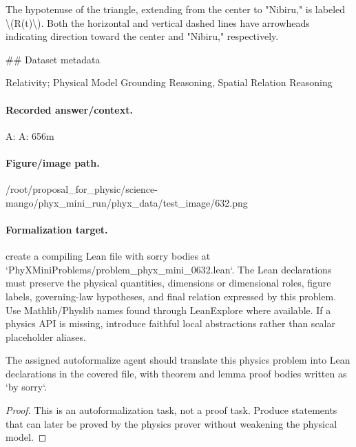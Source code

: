 The hypotenuse of the triangle, extending from the center to "Nibiru," is labeled \textbackslash{}(R(t)\textbackslash{}). Both the horizontal and vertical dashed lines have arrowheads indicating direction toward the center and "Nibiru," respectively.

\#\# Dataset metadata

Relativity; Physical Model Grounding Reasoning, Spatial Relation Reasoning

\paragraph{Recorded answer/context.}
A: A: 656m

\paragraph{Figure/image path.}
/root/proposal\_for\_physic/science-mango/phyx\_mini\_run/phyx\_data/test\_image/632.png

\paragraph{Formalization target.}
create a compiling Lean file with sorry bodies at `PhyXMiniProblems/problem\_phyx\_mini\_0632.lean`. The Lean declarations must preserve the physical quantities, dimensions or dimensional roles, figure labels, governing-law hypotheses, and final relation expressed by this problem.
Use Mathlib/Physlib names found through LeanExplore where available. If a physics API is missing, introduce faithful local abstractions rather than scalar placeholder aliases.

\begin{theorem}
\label{thm:physics:phyx_mini_0632:target}
The assigned autoformalize agent should translate this physics problem into Lean declarations in the covered file, with theorem and lemma proof bodies written as `by sorry`.
\end{theorem}
\begin{proof}
This is an autoformalization task, not a proof task. Produce statements that can later be proved by the physics prover without weakening the physical model.
\end{proof}


